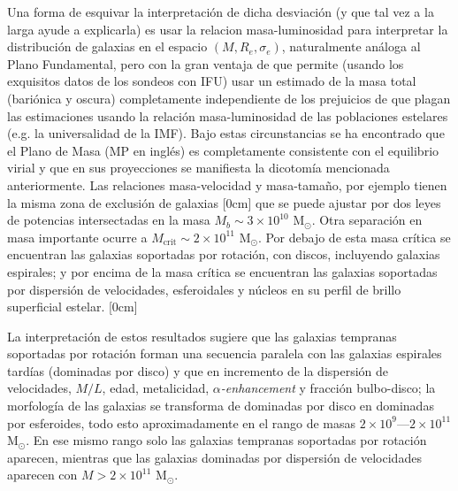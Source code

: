 \documentclass[a4paper,twoside]{article}
\begin{document}
Una forma de esquivar la interpretación de dicha desviación (y que tal vez a la larga ayude a explicarla) es usar la relacion masa-luminosidad para interpretar la distribución de galaxias en el espacio $(M, R_e, \sigma_e)$, naturalmente análoga al Plano Fundamental, pero con la gran ventaja de que permite (usando los exquisitos datos de los sondeos con IFU) usar un estimado de la masa total (bariónica y oscura) completamente independiente de los prejuicios de que plagan las estimaciones usando la relación masa-luminosidad de las poblaciones estelares (e.g. la universalidad de la IMF). Bajo estas circunstancias se ha encontrado que el Plano de Masa (MP en inglés) es completamente consistente con el equilibrio virial y que en sus proyecciones se manifiesta la dicotomía mencionada anteriormente. Las relaciones masa-velocidad y masa-tamaño, por ejemplo tienen la misma zona de exclusión de galaxias [0cm] que se puede ajustar por dos leyes de potencias intersectadas en la masa $M_b\sim3\times10^{10}$ M${}_\odot$. Otra separación en masa importante ocurre a $M_\text{crit}\sim2\times10^{11}$ M${}_\odot$. Por debajo de esta masa crítica se encuentran las galaxias soportadas por rotación, con discos, incluyendo galaxias espirales; y por encima de la masa crítica se encuentran las galaxias soportadas por dispersión de velocidades, esferoidales y núcleos en su perfil de brillo superficial estelar. [0cm]

La interpretación de estos resultados sugiere que las galaxias tempranas soportadas por rotación forman una secuencia paralela con las galaxias espirales tardías (dominadas por disco) y que en incremento de la dispersión de velocidades, $M/L$, edad, metalicidad, \emph{$\alpha$-enhancement} y fracción bulbo-disco; la morfología de las galaxias se transforma de dominadas por disco en dominadas por esferoides, todo esto aproximadamente en el rango de masas $2\times10^{9}$---$2\times10^{11}$ M${}_\odot$. En ese mismo rango solo las galaxias tempranas soportadas por rotación aparecen, mientras que las galaxias dominadas por dispersión de velocidades aparecen con $M>2\times10^{11}$ M${}_\odot$.
\end{document}
